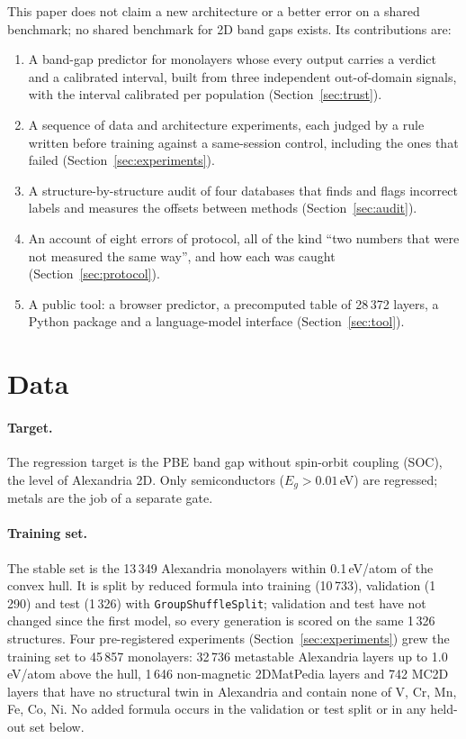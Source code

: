 \documentclass[11pt]{article}
\begin{document}
This paper does not claim a new architecture or a better error on a shared benchmark;
no shared benchmark for 2D band gaps exists. Its contributions are:
\begin{enumerate}
\item A band-gap predictor for monolayers whose every output carries a verdict and a
  calibrated interval, built from three independent out-of-domain signals, with the
  interval calibrated per population (Section~\ref{sec:trust}).
\item A sequence of data and architecture experiments, each judged by a rule written
  before training against a same-session control, including the ones that failed
  (Section~\ref{sec:experiments}).
\item A structure-by-structure audit of four databases that finds and flags incorrect
  labels and measures the offsets between methods (Section~\ref{sec:audit}).
\item An account of eight errors of protocol, all of the kind ``two numbers that were
  not measured the same way'', and how each was caught (Section~\ref{sec:protocol}).
\item A public tool: a browser predictor, a precomputed table of 28\,372 layers, a
  Python package and a language-model interface (Section~\ref{sec:tool}).
\end{enumerate}

\section{Data}\label{sec:data}

\paragraph{Target.} The regression target is the PBE \citep{pbe} band gap without
spin-orbit coupling (SOC), the level of Alexandria 2D. Only semiconductors
($E_g > 0.01$\,eV) are regressed; metals are the job of a separate gate.

\paragraph{Training set.} The stable set is the 13\,349 Alexandria monolayers within
0.1\,eV/atom of the convex hull. It is split by reduced formula into training (10\,733),
validation (1\,290) and test (1\,326) with \texttt{GroupShuffleSplit}; validation and test
have not changed since the first model, so every generation is scored on the same
1\,326 structures. Four pre-registered experiments
(Section~\ref{sec:experiments}) grew the training set to 45\,857 monolayers: 32\,736
metastable Alexandria layers up to 1.0\,eV/atom above the hull, 1\,646 non-magnetic
2DMatPedia layers and 742 MC2D layers that have no structural twin in Alexandria and
contain none of V, Cr, Mn, Fe, Co, Ni. No added formula occurs in the validation or test
split or in any held-out set below.
\end{document}
